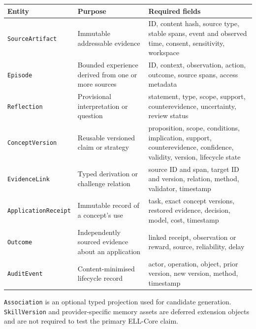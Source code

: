 \documentclass[
  english,
  a4paper,
  DIV=11,
  numbers=noendperiod]{scrreprt}
\newcounter{none} %
\begin{document}
{\def\LTcaptype{none} %
\begin{longtable}[]{@{}
  >{\raggedright\arraybackslash}p{}
  >{\raggedright\arraybackslash}p{}
  >{\raggedright\arraybackslash}p{}@{}}
\toprule\noalign{}
\begin{minipage}[b]{\linewidth}\raggedright
Entity
\end{minipage} & \begin{minipage}[b]{\linewidth}\raggedright
Purpose
\end{minipage} & \begin{minipage}[b]{\linewidth}\raggedright
Required fields
\end{minipage} \\
\midrule\noalign{}
\endhead
\bottomrule\noalign{}
\endlastfoot
\texttt{SourceArtifact} & Immutable addressable evidence & ID, content
hash, source type, stable spans, event and observed time, consent,
sensitivity, workspace \\
\texttt{Episode} & Bounded experience derived from one or more sources &
ID, context, observation, action, outcome, source spans, access
metadata \\
\texttt{Reflection} & Provisional interpretation or question &
statement, type, scope, support, counterevidence, uncertainty, review
status \\
\texttt{ConceptVersion} & Reusable versioned claim or strategy &
proposition, scope, conditions, implication, support, counterevidence,
confidence, validity, version, lifecycle state \\
\texttt{EvidenceLink} & Typed derivation or challenge relation & source
ID and span, target ID and version, relation, method, validator,
timestamp \\
\texttt{ApplicationReceipt} & Immutable record of a concept's use &
task, exact concept versions, restored evidence, decision, model, cost,
timestamp \\
\texttt{Outcome} & Independently sourced evidence about an application &
linked receipt, observation or reward, source, reliability, delay \\
\texttt{AuditEvent} & Content-minimised lifecycle record & actor,
operation, object, prior version, new version, method, timestamp \\
\end{longtable}
}

\texttt{Association} is an optional typed projection used for candidate
generation. \texttt{SkillVersion} and provider-specific memory assets
are deferred extension objects and are not required to test the primary
ELL-Core claim.
\end{document}
